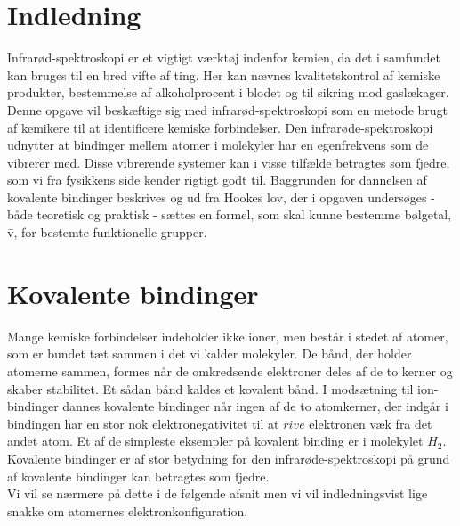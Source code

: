 \chapter*{Indledning}
Infrarød-spektroskopi er et vigtigt værktøj indenfor kemien, da det i samfundet kan bruges til en bred vifte af ting. Her kan nævnes kvalitetskontrol af kemiske produkter, bestemmelse af alkoholprocent i blodet og til sikring mod gaslækager. 
\\

Denne opgave vil beskæftige sig med infrarød-spektroskopi som en metode brugt af kemikere til at identificere kemiske forbindelser. Den infrarøde-spektroskopi udnytter at bindinger mellem atomer i molekyler har en egenfrekvens som de vibrerer med. Disse vibrerende systemer kan i visse tilfælde betragtes som fjedre, som vi fra fysikkens side kender rigtigt godt til. Baggrunden for dannelsen af kovalente bindinger beskrives og ud fra Hookes lov, der i opgaven undersøges - både teoretisk og praktisk - sættes en formel, som skal kunne bestemme bølgetal, \={v}, for bestemte funktionelle grupper.


\chapter{Kovalente bindinger}
Mange kemiske forbindelser indeholder ikke ioner, men består i stedet af atomer, som er bundet tæt sammen i det vi kalder molekyler. De bånd, der holder atomerne sammen, formes når de omkredsende elektroner deles af de to kerner og skaber stabilitet. Et sådan bånd kaldes et kovalent bånd. I modsætning til ion-bindinger dannes kovalente bindinger når ingen af de to atomkerner, der indgår i bindingen har en stor nok elektronegativitet til at $rive$ elektronen væk fra det andet atom. Et af de simpleste eksempler på kovalent binding er i molekylet $H_2$. Kovalente bindinger er af stor betydning for den infrarøde-spektroskopi på grund af kovalente bindinger kan betragtes som fjedre.
\\
Vi vil se nærmere på dette i de følgende afsnit men vi vil indledningsvist lige snakke om atomernes elektronkonfiguration. 

